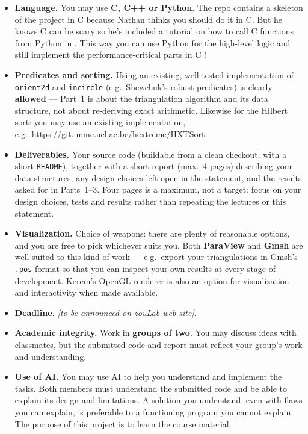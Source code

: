 \documentclass[11pt,a4paper]{article}
\begin{document}
\begin{itemize}[leftmargin=1.4em]
  \item \textbf{Language.} You may use \textbf{C, C++ or Python}.
    The repo contains a skeleton of the project in C because Nathan thinks
    you should do it in C. But he knows C can be scary so he's included a
    tutorial on how to call C functions from Python in
    . This way you can use Python for
    the high-level logic and still implement the performance-critical
    parts in C !
  \item \textbf{Predicates and sorting.} Using an existing, well-tested
    implementation of \lstinline{orient2d} and \lstinline{incircle} (e.g.\
    Shewchuk's robust predicates) is clearly \textbf{allowed} --- Part~1 is
    about the triangulation algorithm and its data structure, not about
    re-deriving exact arithmetic. Likewise for the Hilbert sort: you may use
    an existing implementation, e.g.\
    \url{https://git.immc.ucl.ac.be/hextreme/HXTSort}.
  \item \textbf{Deliverables.} Your source code (buildable from a clean
    checkout, with a short \texttt{README}), together with a short report
    (max.\ 4 pages) describing your data structures, any design choices left
    open in the statement, and the results asked for in Parts~1--3.
    Four pages is a maximum, not a target: focus on your design choices,
    tests and results rather than repeating the lectures or this statement.
  \item \textbf{Visualization.} Choice of weapons: there are plenty of
    reasonable options, and you are free to pick whichever suits you. Both
    \textbf{ParaView} and \textbf{Gmsh} are well suited to this kind of
    work --- e.g.\ export your triangulations in Gmsh's \texttt{.pos} format
    so that you can inspect your own results at every stage of development.
    Kerem's OpenGL renderer is also an option for visualization and
    interactivity when made available.
  \item \textbf{Deadline.} \emph{[to be announced on \href{https://perso.uclouvain.be/vincent.legat/zouLab/meca2170.php}{zouLab web site}]}.
  \item \textbf{Academic integrity.} Work in \textbf{groups of two}. You may
    discuss ideas with classmates, but the submitted code and report must
    reflect your group's work and understanding.
  \item \textbf{Use of AI.} You may use AI to help you understand and
    implement the tasks. Both members must understand the submitted code
    and be able to explain its design and limitations. A solution you
    understand, even with flaws you can explain, is preferable to a
    functioning program you cannot explain. The purpose of this project
    is to learn the course material.
\end{itemize}
\end{document}
